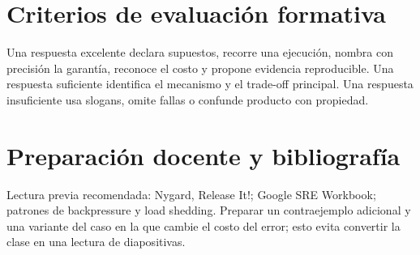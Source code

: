 \documentclass[variant=docente,cover=institutional,mode=screen]{ua-engineering-v6-article}
\begin{document}
\section{Criterios de evaluación formativa}
Una respuesta excelente declara supuestos, recorre una ejecución, nombra con precisión la garantía, reconoce el costo y propone evidencia reproducible. Una respuesta suficiente identifica el mecanismo y el trade-off principal. Una respuesta insuficiente usa slogans, omite fallas o confunde producto con propiedad.

\section{Preparación docente y bibliografía}
Lectura previa recomendada: Nygard, Release It!; Google SRE Workbook; patrones de backpressure y load shedding. Preparar un contraejemplo adicional y una variante del caso en la que cambie el costo del error; esto evita convertir la clase en una lectura de diapositivas.
\end{document}
